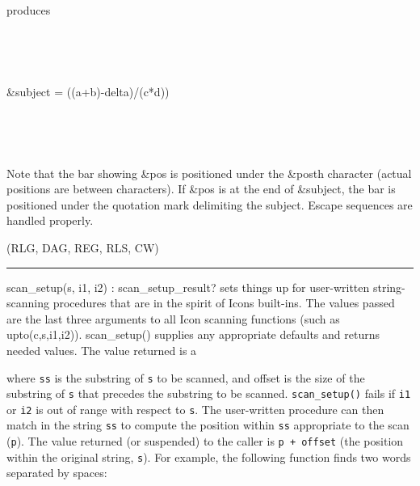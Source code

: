 produces


{\ttfamily
{\textbar}
\ \ \ \ \ \ \ \ \ \ \ \ \ \ \ \ \ \ \ \ \ \ \ \ \ \ \ \ \ \ \ \ \ \ {\textbar}}

{\ttfamily
{\textbar}
\ \ \ \ \ \ \ \ \ \ \ \ \ \ \ \ \ \ \ \ \ \ \ \ \ \ \ \ \ \ \ \ \ \ {\textbar}}

{\ttfamily
{\textbar} \&subject =
{\textquotedbl}((a+b)-delta)/(c*d)){\textquotedbl} {\textbar}}

{\ttfamily
{\textbar} \ \ \ \ \ \ \ \ \ \ \ \ \ \ \ \ \ \ \ \ \ \ \ \ \ {\textbar}
\ \ \ \ \ \ \ {\textbar}}

{\ttfamily
{\textbar}
\ \ \ \ \ \ \ \ \ \ \ \ \ \ \ \ \ \ \ \ \ \ \ \ \ \ \ \ \ \ \ \ \ \ {\textbar}}

\iconcode{
{}-{}-{}-{}-{}-{}-{}-{}-{}-{}-{}-{}-{}-{}-{}-{}-{}-{}-{}-{}-{}-{}-{}-{}-{}-{}-{}-{}-{}-{}-{}-{}-{}-{}-{}-{}-{}-}

Note that the bar showing \textsf{\&pos} is positioned under the
\textsf{\&pos{\textquotesingle}}th character (actual positions are
between characters). If \textsf{\&pos} is at the end of
\textsf{\&subject}, the bar is positioned under the quotation mark
delimiting the subject. Escape sequences are handled properly. 

(RLG, DAG, REG, RLS, CW)

\vspace{0.25cm}\hrule{}

\textsf{scan\_setup(s, i1, i2) : scan\_setup\_result?} sets things up
for user-written string-scanning procedures that are in the spirit of
Icon{\textquotesingle}s built-ins. The values passed are the last three
arguments to all Icon scanning functions (such as
\textsf{upto(c,s,i1,i2)}). \textsf{scan\_setup()} supplies any
appropriate defaults and returns needed values. The value returned is a


where \texttt{ss} is the substring of \texttt{s} to be scanned, and
offset is the size of the substring of \texttt{s} that precedes the
substring to be scanned. \texttt{scan\_setup()} fails if \texttt{i1} or
\texttt{i2} is out of range with respect to \texttt{s}. The
user-written procedure can then match in the string \texttt{ss} to
compute the position within \texttt{ss} appropriate to the scan
(\texttt{p}). The value returned (or suspended) to the caller is
\texttt{p + offset} (the position within the original string,
\texttt{s}). For example, the following function finds two words
separated by spaces:

